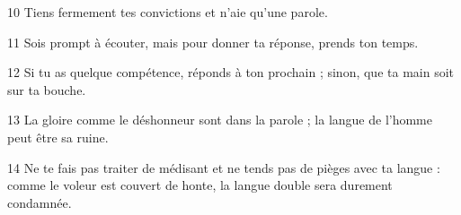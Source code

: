 
10 Tiens fermement tes convictions et n’aie qu’une parole.

11 Sois prompt à écouter, mais pour donner ta réponse, prends ton temps.

12 Si tu as quelque compétence, réponds à ton prochain ; sinon, que ta main soit sur ta bouche.

13 La gloire comme le déshonneur sont dans la parole ; la langue de l’homme peut être sa ruine.

14 Ne te fais pas traiter de médisant et ne tends pas de pièges avec ta langue : comme le voleur est couvert de honte, la langue double sera durement condamnée.